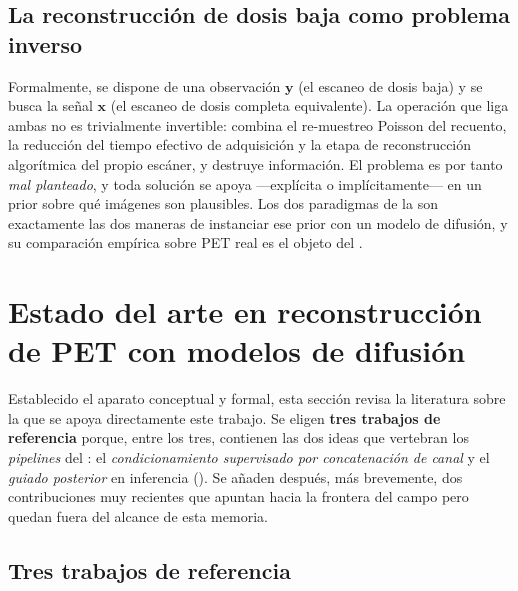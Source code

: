 \subsection{La reconstrucción de dosis baja como problema inverso}
\label{subsec:pet-problema-inverso}

Formalmente, se dispone de una observación $\mathbf{y}$ (el escaneo
de dosis baja) y se busca la señal $\mathbf{x}$ (el escaneo de dosis
completa equivalente). La operación que liga ambas no es trivialmente
invertible: combina el re-muestreo Poisson del recuento, la reducción
del tiempo efectivo de adquisición y la etapa de reconstrucción
algorítmica del propio escáner, y destruye información. El problema
es por tanto \emph{mal planteado}, y toda solución se apoya —explícita
o implícitamente— en un prior sobre qué imágenes son plausibles. Los
dos paradigmas de la  son
exactamente las dos maneras de instanciar ese prior con un modelo de
difusión, y su comparación empírica sobre PET real es el objeto del
.

\section{Estado del arte en reconstrucción de PET con modelos de
difusión}
\label{sec:estado-del-arte}

Establecido el aparato conceptual y formal, esta sección revisa la
literatura sobre la que se apoya directamente este trabajo. Se eligen
\textbf{tres trabajos de referencia} porque, entre los tres, contienen
las dos ideas que vertebran los \textit{pipelines} del :
el \emph{condicionamiento supervisado por concatenación de canal} y el
\emph{guiado posterior} en inferencia
(). Se añaden después, más
brevemente, dos contribuciones muy recientes que apuntan hacia la
frontera del campo pero quedan fuera del alcance de esta memoria.

\subsection{Tres trabajos de referencia}
\label{subsec:soa-referencia}

